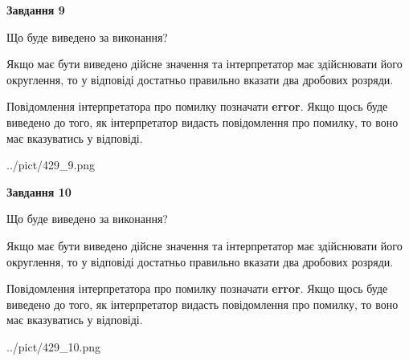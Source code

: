 \documentclass[12pt, ukrainian]{article}
\begin{document}
{\begin {Large}
{\begin {center}\textbf{Завдання 9}\end {center}}\par
Що буде виведено за виконання? \par

Якщо має бути виведено дійсне значення та інтерпретатор має здійснювати його округлення, 
то у відповіді достатньо правильно вказати два дробових розряди.

Повідомлення інтерпретатора про помилку позначати \textbf{error}.
Якщо щось буде виведено до того, як інтерпретатор видасть повідомлення про помилку, 
то воно має вказуватись у відповіді. \par

\begin{center}
	{../pict/429_9.png}
\end{center}
\newpage

{\begin {center}\textbf{Завдання 10}\end {center}}\par
Що буде виведено за виконання? \par

Якщо має бути виведено дійсне значення та інтерпретатор має здійснювати його округлення, 
то у відповіді достатньо правильно вказати два дробових розряди.

Повідомлення інтерпретатора про помилку позначати \textbf{error}.
Якщо щось буде виведено до того, як інтерпретатор видасть повідомлення про помилку, 
то воно має вказуватись у відповіді. \par

\begin{center}
	{../pict/429_10.png}
\end{center}
\newpage

\end {Large}}
\end{document}
